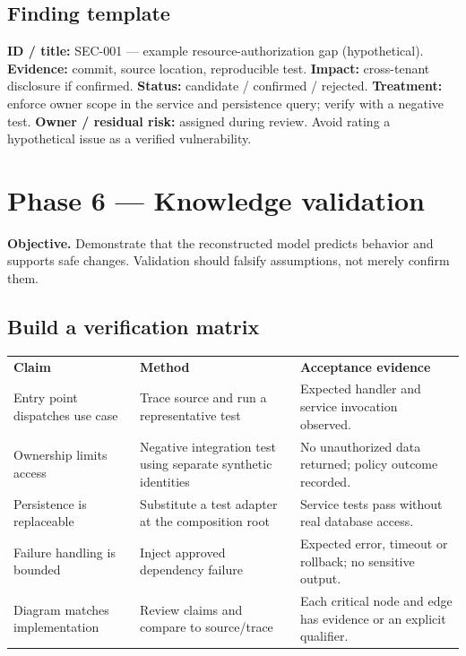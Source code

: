 \documentclass[11pt,letterpaper]{article}
\begin{document}
\subsection{Finding template}
\textbf{ID / title:} SEC-001 --- example resource-authorization gap (hypothetical). \textbf{Evidence:} commit, source location, reproducible test. \textbf{Impact:} cross-tenant disclosure if confirmed. \textbf{Status:} candidate / confirmed / rejected. \textbf{Treatment:} enforce owner scope in the service and persistence query; verify with a negative test. \textbf{Owner / residual risk:} assigned during review. Avoid rating a hypothetical issue as a verified vulnerability.
\clearpage
\section{Phase 6 --- Knowledge validation}
\textbf{Objective.} Demonstrate that the reconstructed model predicts behavior and supports safe changes. Validation should falsify assumptions, not merely confirm them.
\subsection{Build a verification matrix}

\noindent\begin{tabularx}{\linewidth}{@{}P{1.7in}Y Y@{}}
\color{white}\textbf{Claim}&\color{white}\textbf{Method}&\color{white}\textbf{Acceptance evidence}\\
Entry point dispatches use case & Trace source and run a representative test & Expected handler and service invocation observed.\\
Ownership limits access & Negative integration test using separate synthetic identities & No unauthorized data returned; policy outcome recorded.\\
Persistence is replaceable & Substitute a test adapter at the composition root & Service tests pass without real database access.\\
Failure handling is bounded & Inject approved dependency failure & Expected error, timeout or rollback; no sensitive output.\\
Diagram matches implementation & Review claims and compare to source/trace & Each critical node and edge has evidence or an explicit qualifier.\\
\bottomrule
\end{tabularx}
\end{document}
